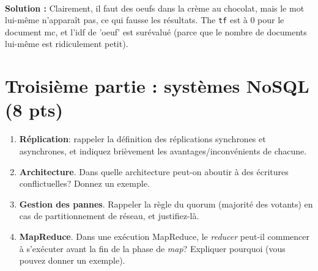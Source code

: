 \documentclass[9pt,a4paper]{article}
\newenvironment{solution}[0]{
~\\ \color{red} \textbf{Solution :}\color{black}}{%
}
\begin{document}
\begin{solution}
Clairement, il faut des oeufs dans la crème au chocolat, mais le mot lui-même n'apparaît pas, ce qui fausse
les résultats. The \texttt{tf} est à 0 pour le document mc, et l'idf de 'oeuf' est surévalué (parce que le
nombre de documents lui-même est ridiculement petit).
\end{solution}

\section*{Troisième partie : systèmes NoSQL (8 pts)}

\begin{enumerate}
  \item \textbf{Réplication}: rappeler la définition des réplications synchrones et asynchrones, et indiquez
      brièvement les avantages/inconvénients de chacune.
      
  \item \textbf{Architecture}. Dans quelle architecture peut-on aboutir à des écritures conflictuelles? Donnez un exemple.
  
  \item \textbf{Gestion des pannes}. Rappeler la règle du quorum (majorité des votants) en cas de partitionnement de réseau, et
        justifiez-là.
        
   \item \textbf{MapReduce}. Dans une exécution MapReduce, le \textit{reducer} peut-il commencer à s'exécuter
      avant la fin de la phase de \textit{map}? Expliquer pourquoi (vous pouvez donner un exemple).
\end{enumerate}
\end{document}

